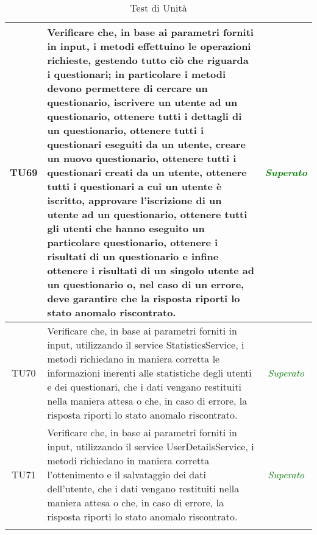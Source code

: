 \begin{longtable}{|c|>{}m{10cm}|c|}
\hypertarget{TU69}{TU69} & Verificare che, in base ai parametri forniti in input, i metodi effettuino le operazioni richieste, gestendo tutto ciò che riguarda i questionari; in particolare i metodi devono permettere di cercare un questionario, iscrivere un utente ad un questionario, ottenere tutti i dettagli di un questionario, ottenere tutti i questionari eseguiti da un utente, creare un nuovo questionario, ottenere tutti i questionari creati da un utente, ottenere tutti i questionari a cui un utente è iscritto, approvare l'iscrizione di un utente ad un questionario, ottenere tutti gli utenti che hanno eseguito un particolare questionario, ottenere i risultati di un questionario e infine ottenere i risultati di un singolo utente ad un questionario o, nel caso di un errore, deve garantire che la risposta riporti lo stato anomalo riscontrato. & \textcolor{Green}{\textit{Superato}}\\ \hline
\hypertarget{TU70}{TU70} & Verificare che, in base ai parametri forniti in input, utilizzando il service StatisticsService, i metodi richiedano in maniera corretta le informazioni inerenti alle statistiche degli utenti e dei questionari, che i dati vengano restituiti nella maniera attesa o che, in caso di errore, la risposta riporti lo stato anomalo riscontrato. & \textcolor{Green}{\textit{Superato}}\\ \hline
\hypertarget{TU71}{TU71} & Verificare che, in base ai parametri forniti in input, utilizzando il service UserDetailsService, i metodi richiedano in maniera corretta l'ottenimento  e il salvataggio dei dati dell'utente, che i dati vengano restituiti nella maniera attesa o che, in caso di errore, la risposta riporti lo stato
anomalo riscontrato. & \textcolor{Green}{\textit{Superato}}\\ \hline
\caption[Test di Unità]{Test di Unità}
\label{tabella:test3}
\end{longtable}
\clearpage